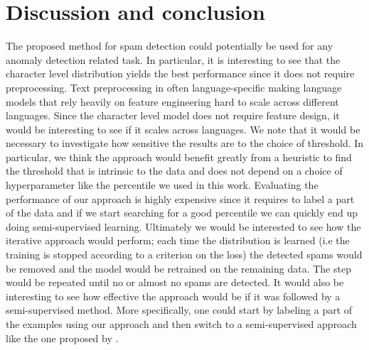 \documentclass[10pt]{article}
\begin{document}
\section{Discussion  and  conclusion}
The proposed method for spam detection could potentially be used for any anomaly detection related task. In particular, it is interesting to see that the character level distribution yields the best performance since it does not require preprocessing. Text preprocessing in often language-specific making language models that rely heavily on feature engineering hard to scale across different languages. Since the character level model does not require feature design, it would be interesting to see if it scales across languages. We note that it would be necessary to investigate how sensitive the results are to the choice of threshold. In particular, we think the approach would benefit greatly from a heuristic to find the threshold that is intrinsic to the data and does not depend on a choice of hyperparameter like the percentile we used in this work. Evaluating the performance of our approach is highly expensive since it requires to label a part of the data and if we start searching for a good percentile we can quickly end up doing semi-supervised learning. Ultimately we would be interested to see how the iterative approach would perform; each time the distribution is learned (i.e the training is stopped according to a criterion on the loss) the detected spams would be removed and the model would be retrained on the remaining data. The step would be repeated until no or almost no spams are detected. It would also be interesting to see how effective the approach would be if it was followed by a semi-supervised method. More specifically, one could start by labeling a part of the examples using our approach and then switch to a semi-supervised approach like the one proposed by \cite{NIPS2014_5352}.


  
 
\end{document}

